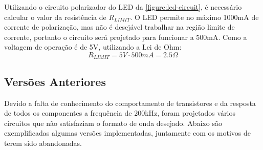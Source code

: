 	Utilizando o circuito polarizador do LED da \autoref{figure:led-circuit}, é necessário calcular o valor da resistência de $R_{LIMIT}$. O LED permite no máximo 1000mA de corrente de polarização, mas não é desejável trabalhar na região limite de corrente, portanto o circuito será projetado para funcionar a 500mA. Como a voltagem de operação é de 5V, utilizando a Lei de Ohm:
	\begin{equation}
	R_{LIMIT} = 5V \cdot 500mA = 2.5\Omega
	\end{equation}
	
	\subsection{Versões Anteriores}
	
	Devido a falta de conhecimento do comportamento de transistores e da resposta de todos os componentes a frequência de 200kHz, foram projetados vários circuitos que não satisfaziam o formato de onda desejado. Abaixo são exemplificadas algumas versões implementadas, juntamente com os motivos de terem sido abandonadas.
	
